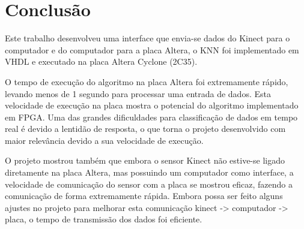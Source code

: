 \section{Conclus\~ao}\label{sec:figs}

Este trabalho desenvolveu uma interface que envia-se dados do Kinect para o computador e do computador para a placa Altera, o KNN foi implementado em VHDL e executado na placa Altera Cyclone (2C35).

O tempo de execução do algoritmo na placa Altera foi extremamente rápido, levando menos de 1 segundo para processar uma entrada de dados. Esta velocidade de execução na placa mostra o potencial do algoritmo implementado em FPGA. Uma das grandes dificuldades para classificação de
dados em tempo real é devido a lentidão de resposta, o que torna o projeto desenvolvido com maior relevância devido a sua velocidade de
execução. 

O projeto mostrou também que embora o sensor Kinect não estive-se ligado diretamente na placa Altera, mas possuindo um computador como interface, a velocidade de comunicação do sensor com a placa se mostrou eficaz, fazendo a comunicação de forma extremamente rápida. Embora possa ser feito alguns ajustes no projeto para melhorar esta comunicação kinect -> computador -> placa, o tempo de transmissão dos dados foi eficiente.


